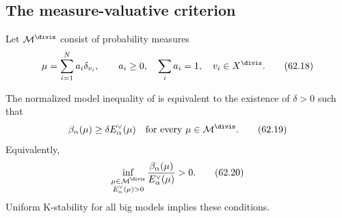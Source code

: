\subsection{The measure-valuative criterion}
\label{subsec:mpwn-k-valuative-criterion}

\begin{definition}
\label{def:mpwn-divisorial-measures}
Let $\mathcal M^{\divis}$ consist of probability measures
\[
                       \mu=\sum_{i=1}^N a_i\delta_{v_i},
 \qquad a_i\geq0,\quad\sum_i a_i=1,\quad v_i\in X^{\divis}.
\tag{62.18}\label{eq:mpwn-divisorial-measure}
\]
\end{definition}

\begin{theorem}\label{thm:mpwn-valuative-criterion}
The normalized model inequality of
 is equivalent to the existence of
$\delta>0$ such that
\[
             \beta_\alpha(\mu)
             \geq\delta E_\alpha^\vee(\mu)
        \quad\text{for every }\mu\in\mathcal M^{\divis}.
\tag{62.19}\label{eq:mpwn-beta-criterion}
\]
Equivalently,
\[
 \inf_{\substack{\mu\in\mathcal M^{\divis}\\
                  E_\alpha^\vee(\mu)>0}}
       \frac{\beta_\alpha(\mu)}{E_\alpha^\vee(\mu)}>0.
\tag{62.20}\label{eq:mpwn-beta-ratio}
\]
Uniform K-stability for all big models implies these conditions.
\end{theorem}


